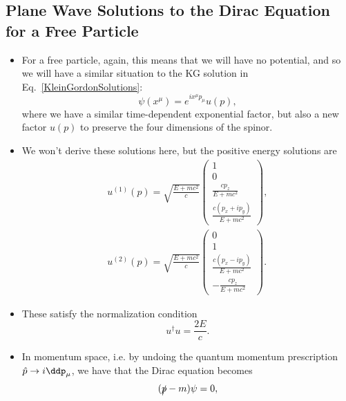




\subsection{Plane Wave Solutions to the Dirac Equation for a Free Particle}

\begin{itemize}
    \item For a free particle, again, this means that we will have no potential, and so we will have a similar situation to the KG solution in Eq.~\eqref{KleinGordonSolutions}:
        \begin{equation}
            \psi(x^{\mu}) = e^{ix^{\mu}p_{\mu}} u(p),
        \end{equation}
        where we have a similar time-dependent exponential factor, but also a new factor $u(p)$ to preserve the four dimensions of the spinor.
    \item We won't derive these solutions here, but the positive energy solutions are 
        \begin{gather}
            u^{(1)}(p) = \sqrt{\frac{E+mc^2}{c}} \begin{pmatrix} 1 \\[5pt] 0 \\[5pt] \frac{cp_z}{E+mc^2} \\[5pt] \frac{c(p_x + ip_y)}{E+mc^2}  \end{pmatrix}, \\
            u^{(2)}(p) = \sqrt{\frac{E+mc^2}{c}} \begin{pmatrix} 0 \\[5pt] 1 \\[5pt] \frac{c(p_x - ip_y)}{E+mc^2} \\[5pt] -\frac{cp_z}{E+mc^2}  \end{pmatrix}.
        \end{gather}
    \item These satisfy the normalization condition 
        \begin{equation}
            u^{\dagger}u = \frac{2E}{c}.\label{SpinorNormCondition}
        \end{equation}
    \item In momentum space, i.e. by undoing the quantum momentum prescription $\hat{p} \rightarrow i\ddp_{\mu}$, we have that the Dirac equation becomes
        \begin{equation}
            (\slashed{p} - m)\psi = 0,
        \end{equation}

\end{itemize}
